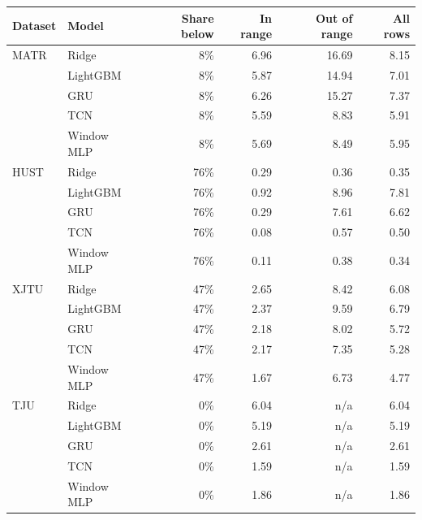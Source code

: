 \begin{tabular}{llrrrr}
\toprule
Dataset & Model & Share below & In range & Out of range & All rows \\
\midrule
MATR & Ridge & 8\% & 6.96 & 16.69 & 8.15 \\
 & LightGBM & 8\% & 5.87 & 14.94 & 7.01 \\
 & GRU & 8\% & 6.26 & 15.27 & 7.37 \\
 & TCN & 8\% & 5.59 & 8.83 & 5.91 \\
 & Window MLP & 8\% & 5.69 & 8.49 & 5.95 \\
HUST & Ridge & 76\% & 0.29 & 0.36 & 0.35 \\
 & LightGBM & 76\% & 0.92 & 8.96 & 7.81 \\
 & GRU & 76\% & 0.29 & 7.61 & 6.62 \\
 & TCN & 76\% & 0.08 & 0.57 & 0.50 \\
 & Window MLP & 76\% & 0.11 & 0.38 & 0.34 \\
XJTU & Ridge & 47\% & 2.65 & 8.42 & 6.08 \\
 & LightGBM & 47\% & 2.37 & 9.59 & 6.79 \\
 & GRU & 47\% & 2.18 & 8.02 & 5.72 \\
 & TCN & 47\% & 2.17 & 7.35 & 5.28 \\
 & Window MLP & 47\% & 1.67 & 6.73 & 4.77 \\
TJU & Ridge & 0\% & 6.04 & n/a & 6.04 \\
 & LightGBM & 0\% & 5.19 & n/a & 5.19 \\
 & GRU & 0\% & 2.61 & n/a & 2.61 \\
 & TCN & 0\% & 1.59 & n/a & 1.59 \\
 & Window MLP & 0\% & 1.86 & n/a & 1.86 \\
\bottomrule
\end{tabular}
